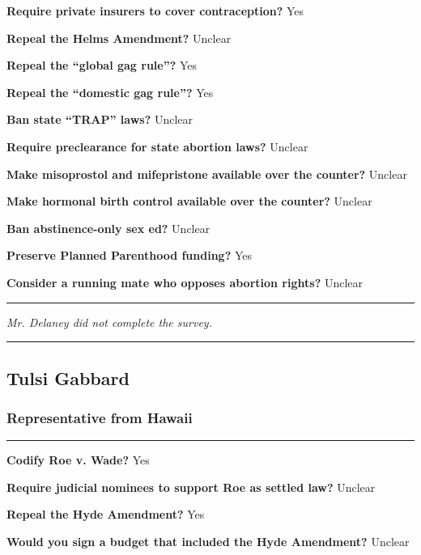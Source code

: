 \textbf{Require private insurers to cover contraception?} Yes

\textbf{Repeal the Helms Amendment?} Unclear

\textbf{Repeal the ``global gag rule''?} Yes

\textbf{Repeal the ``domestic gag rule''?} Yes

\textbf{Ban state ``TRAP'' laws?} Unclear

\textbf{Require preclearance for state abortion laws?} Unclear

\textbf{Make misoprostol and mifepristone available over the counter?}
Unclear

\textbf{Make hormonal birth control available over the counter?} Unclear

\textbf{Ban abstinence-only sex ed?} Unclear

\textbf{Preserve Planned Parenthood funding?} Yes

\textbf{Consider a running mate who opposes abortion rights?} Unclear

\begin{center}\rule{0.5\linewidth}{\linethickness}\end{center}

\emph{Mr. Delaney did not complete the survey.}

\begin{center}\rule{0.5\linewidth}{\linethickness}\end{center}

\hypertarget{tulsi-gabbard}{%
\subsection{Tulsi Gabbard}\label{tulsi-gabbard}}

\hypertarget{representative-from-hawaii}{%
\subsubsection{Representative from
Hawaii}\label{representative-from-hawaii}}

\begin{center}\rule{0.5\linewidth}{\linethickness}\end{center}

\textbf{Codify Roe v. Wade?} Yes

\textbf{Require judicial nominees to support Roe as settled law?}
Unclear

\textbf{Repeal the Hyde Amendment?} Yes

\textbf{Would you sign a budget that included the Hyde Amendment?}
Unclear

